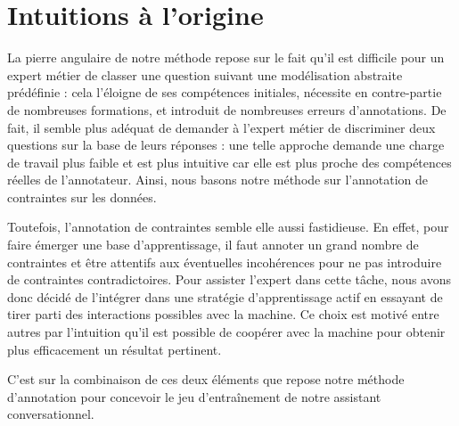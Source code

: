 	\minitoc


	\section{Intuitions à l'origine}
	\label{section:3.1-DESCRIPTION-INTUITIONS}

		La pierre angulaire de notre méthode repose sur le fait qu'il est difficile pour un expert métier de classer une question suivant une modélisation abstraite prédéfinie :
		cela l'éloigne de ses compétences initiales, nécessite en contre-partie de nombreuses formations, et introduit de nombreuses erreurs d'annotations.
		De fait, il semble plus adéquat de demander à l'expert métier de discriminer deux questions sur la base de leurs réponses :
		une telle approche demande une charge de travail plus faible et est plus intuitive car elle est plus proche des compétences réelles de l'annotateur.
		Ainsi, nous basons notre méthode sur l'annotation de contraintes sur les données.
		
		Toutefois, l'annotation de contraintes semble elle aussi fastidieuse.
		En effet, pour faire émerger une base d'apprentissage, il faut annoter un grand nombre de contraintes et être attentifs aux éventuelles incohérences pour ne pas introduire de contraintes contradictoires.
		Pour assister l'expert dans cette tâche, nous avons donc décidé de l'intégrer dans une stratégie d'apprentissage actif en essayant de tirer parti des interactions possibles avec la machine. Ce choix est motivé entre autres par l'intuition qu'il est possible de coopérer avec la machine pour obtenir plus efficacement un résultat pertinent.

		C'est sur la combinaison de ces deux éléments que repose notre méthode d'annotation pour concevoir le jeu d’entraînement de notre assistant conversationnel.


